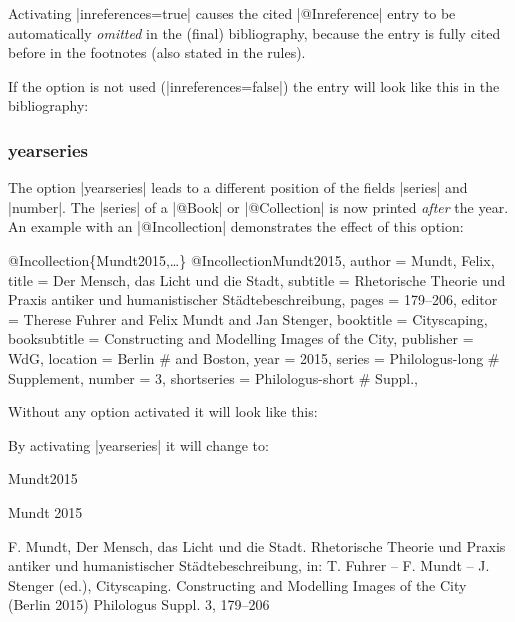 \documentclass[a4paper,
10pt,
greek,
french,
spanish,
italian,
ngerman,
english
]{ltxdoc}
\begin{document}
\begin{marker}
    Activating |inreferences=true| causes the cited |@Inreference| entry to be automatically \emph{omitted} in the (final) bibliography,
because the entry is fully cited before in the footnotes (also stated in the \DAI rules).
\end{marker}

If the option is not used (|inreferences=false|) the entry will look like this in the bibliography:


\subsubsection{yearseries}\label{yearseries}
The option |yearseries| leads to a different position of the fields |series| and |number|.
The |series| of a |@Book| or |@Collection| is now printed \emph{after} the year.
An example with an |@Incollection| demonstrates the effect of this option:
 
\begin{bibexample}[label=Mundt2015]{{@}Incollection\{Mundt2015,…\}}
@Incollection{Mundt2015,
  author       = {Mundt, Felix},
  title        = {Der Mensch, das Licht und die Stadt},
  subtitle     = {Rhetorische Theorie und Praxis antiker und humanistischer Städtebeschreibung},
  pages        = {179--206},
  editor       = {Therese Fuhrer and Felix Mundt and Jan Stenger},
  booktitle    = {Cityscaping},
  booksubtitle = {Constructing and Modelling Images of the City},
  publisher    = WdG,
  location     = Berlin #{ and Boston}, %
  year         = {2015},
  series       = Philologus-long #{ Supplement},
  number       = {3},
  shortseries  = Philologus-short #{ Suppl.},
}
\end{bibexample}

Without any option activated it will look like this:
 
By activating |yearseries| it will change to:
\begin{bibbox}{Mundt2015}\footnotesize
\parbox[t]{1.7cm}{Mundt 2015} \parbox[t]{9cm}{F. Mundt, Der Mensch, das Licht und die Stadt. Rhetorische Theorie und Praxis antiker und humanistischer Städtebeschreibung, in: T. Fuhrer -- F. Mundt -- J. Stenger (ed.), Cityscaping. Constructing and Modelling Images of the City (Berlin 2015) {\color{red}Philologus Suppl. 3,} 179–206}
\end{bibbox}
\end{document}
